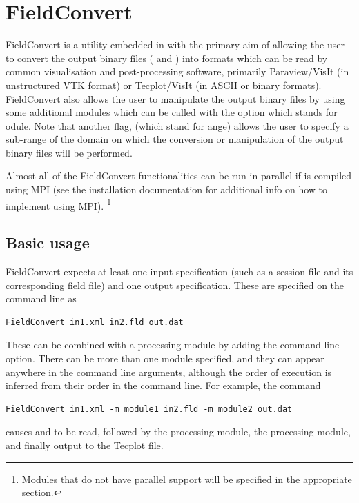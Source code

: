 \chapter{FieldConvert}
\label{s:utilities:fieldconvert}
FieldConvert is a utility embedded in \nekpp with the primary aim of allowing
the user to convert the \nekpp output binary files ( and
) into formats which can be read by common visualisation and
post-processing software, primarily Paraview/VisIt (in unstructured VTK
 format) or Tecplot/VisIt (in ASCII  or binary
 formats). FieldConvert also allows the user to manipulate the
\nekpp output binary files by using some additional modules which can be called
with the option  which stands for odule. Note that another
flag,  (which stand for ange) allows the user to specify a
sub-range of the domain on which the conversion or manipulation of the \nekpp
output binary files will be performed.

Almost all of the FieldConvert functionalities can be run in parallel if \nekpp
is compiled using MPI (see the installation documentation for additional info on
how to implement \nekpp using MPI). \footnote{Modules that do not have parallel
  support will be specified in the appropriate section.}
%
%
%
\section{Basic usage}
FieldConvert expects at least one input specification (such as a session file
and its corresponding field file) and one output specification. These are
specified on the command line as
%
\begin{lstlisting}[style=BashInputStyle]
  FieldConvert in1.xml in2.fld out.dat
\end{lstlisting}
%
These can be combined with a processing module by adding the  command
line option. There can be more than one module specified, and they can appear
anywhere in the command line arguments, although the order of execution is
inferred from their order in the command line. For example, the command
%
\begin{lstlisting}[style=BashInputStyle]
  FieldConvert in1.xml -m module1 in2.fld -m module2 out.dat
\end{lstlisting}
%
causes  and  to be read, followed by the
 processing module, the  processing module, and
finally output to the  Tecplot file.

